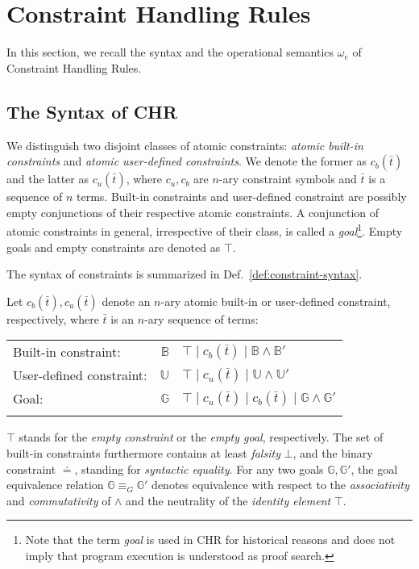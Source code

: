 \documentclass[acmtocl]{acmtrans2m}
\newcommand{\B}{\ensuremath{\mathbb{B}}}
\newcommand{\U}{\ensuremath{\mathbb{U}}}
\newcommand{\G}{\ensuremath{\mathbb{G}}}
\newcommand{\cb}{\ensuremath{c_b(\bar t)}}
\newcommand{\cu}{\ensuremath{c_u(\bar t)}}
\newcommand{\bt}{\bar{t}}
\renewcommand{\bt}{\bar{t}}
\newcommand{\oesq}{\ensuremath{\omega_{e}}}
\begin{document}
\section{Constraint Handling Rules}
\label{sec:chr}

In this section, we recall the syntax and the operational semantics $\oesq$ of
Constraint Handling Rules.

\subsection{The Syntax of CHR}
\label{sec:syn}

We distinguish two disjoint classes of atomic constraints: \emph{atomic built-in
constraints} and \emph{atomic user-defined constraints}. We denote the former as
$\cb$ and the latter as $\cu$, where $c_u,c_b$ are $n$-ary constraint symbols and
$\bt$ is a sequence of $n$ terms. Built-in constraints and user-defined
constraint are  possibly empty  conjunctions of their respective atomic
constraints. A conjunction of atomic constraints in general, irrespective of
their class, is called a \emph{goal}\footnote{Note that the term \emph{goal} is used in
CHR for historical reasons and does not imply that program execution is
understood as proof search.}. Empty goals and empty constraints are denoted as
$\top$.

The syntax of constraints is summarized in
Def.~\ref{def:constraint-syntax}.

\begin{definition}
\label{def:constraint-syntax}
Let $\cb,\cu$ denote an $n$-ary atomic built-in or user-defined constraint, respectively,
where $\bt$ is an $n$-ary sequence of terms:
\begin{tabular}{l @{\quad} r @{$\,::=\,$} l}
\\
Built-in constraint: & $\B$ & $\top \mid \cb \mid \B \wedge \B'$ \\
User-defined constraint: & $\U$ & $\top \mid \cu \mid \U \wedge \U'$ \\
Goal: & $\G$  & $\top \mid \cu \mid \cb \mid \G \wedge \G'$ \\
\\
\end{tabular}

$\top$ stands for the \emph{empty constraint} or the \emph{empty goal},
respectively. The set of built-in constraints furthermore contains at least
\emph{falsity} $\bot$, and the binary constraint $\doteq$, standing for
\emph{syntactic equality}.
For any two goals $\G,\G'$, the goal equivalence relation $\G\equiv_{G}\G'$
denotes equivalence with respect to the \emph{associativity} and
\emph{commutativity} of $\wedge$ and the neutrality of the \emph{identity
element} $\top$.
\end{definition}
\end{document}
